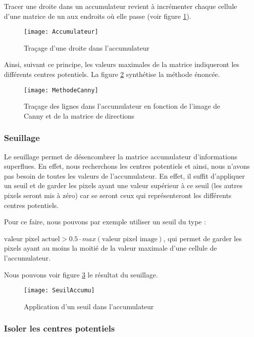 Tracer une droite dans un accumulateur revient à incrémenter chaque cellule d’une matrice de un aux endroits où elle passe (voir figure \ref{fig:Accumulateur}).

\begin{figure}[h]
  \centering
  \texttt{[image: Accumulateur]}
  \caption{Traçage d’une droite dans l’accumulateur}
  \label{fig:Accumulateur}
\end{figure}

Ainsi, suivant ce principe, les valeurs maximales de la matrice indiqueront les différents centres potentiels. La figure \ref{fig:MethodeCanny} synthétise la méthode énoncée. 

\begin{figure}[h]
  \centering
  \texttt{[image: MethodeCanny]}
  \caption{Traçage des lignes dans l’accumulateur en fonction de l’image de Canny et de la matrice de directions}
  \label{fig:MethodeCanny}
\end{figure}

\subsubsection{Seuillage}

Le seuillage permet de désencombrer la matrice accumulateur d’informations superflues. En effet, nous recherchons les centres potentiels et ainsi, nous n’avons pas besoin de toutes les valeurs de l’accumulateur. En effet, il suffit d’appliquer un seuil et de garder les pixels ayant une valeur supérieur à ce seuil (les autres pixels seront mis à zéro) car se seront ceux qui représenteront les différents centres potentiels. 

Pour ce faire, nous pouvons par exemple utiliser un seuil du type :

$\text{valeur pixel actuel} > 0.5 \cdot max(\text{valeur pixel image})$, qui permet de garder les pixels ayant au moins la moitié de la valeur maximale d’une cellule de l’accumulateur.

Nous pouvons voir figure \ref{fig:SeuilAccumu} le résultat du seuillage.

\begin{figure}[h]
  \centering
  \texttt{[image: SeuilAccumu]}
  \caption{Application d’un seuil dans l’accumulateur}
  \label{fig:SeuilAccumu}
\end{figure}

\subsubsection{Isoler les centres potentiels}


